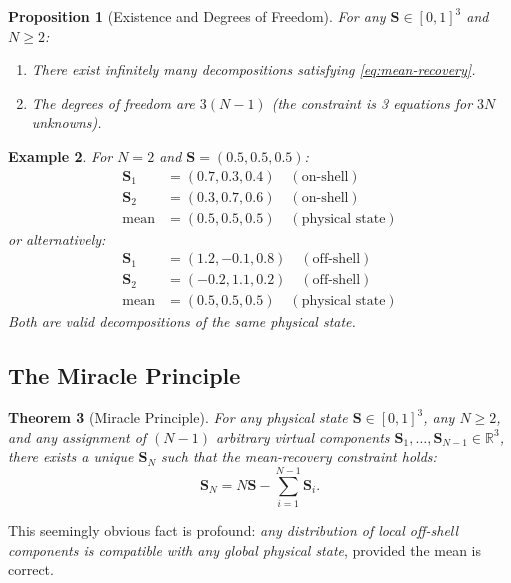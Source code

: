 \documentclass[twocolumn,11pt,a4paper]{article}
\newtheorem{theorem}{Theorem}[section]
\newtheorem{proposition}[theorem]{Proposition}
\newtheorem{example}[theorem]{Example}
\newcommand{\Stuple}{\mathbf{S}}
\begin{document}
\begin{proposition}[Existence and Degrees of Freedom]
For any $\Stuple \in [0,1]^3$ and $N \geq 2$:
\begin{enumerate}[nosep,label=(\roman*)]
  \item There exist infinitely many decompositions satisfying \eqref{eq:mean-recovery}.
  \item The degrees of freedom are $3(N-1)$ (the constraint is 3 equations for $3N$ unknowns).
\end{enumerate}
\end{proposition}

\begin{example}
For $N=2$ and $\Stuple = (0.5, 0.5, 0.5)$:
\begin{align}
\Stuple_1 &= (0.7, 0.3, 0.4) \quad (\text{on-shell})\\
\Stuple_2 &= (0.3, 0.7, 0.6) \quad (\text{on-shell})\\
\text{mean} &= (0.5, 0.5, 0.5) \quad (\text{physical state})
\end{align}
or alternatively:
\begin{align}
\Stuple_1 &= (1.2, -0.1, 0.8) \quad (\text{off-shell})\\
\Stuple_2 &= (-0.2, 1.1, 0.2) \quad (\text{off-shell})\\
\text{mean} &= (0.5, 0.5, 0.5) \quad (\text{physical state})
\end{align}
Both are valid decompositions of the same physical state.
\end{example}

\subsection{The Miracle Principle}

\begin{theorem}[Miracle Principle]
For any physical state $\Stuple \in [0,1]^3$, any $N \geq 2$, and any assignment of $(N-1)$ arbitrary virtual components $\Stuple_1, \ldots, \Stuple_{N-1} \in \mathbb{R}^3$, there exists a unique $\Stuple_N$ such that the mean-recovery constraint holds:
\begin{equation}
  \Stuple_N = N\Stuple - \sum_{i=1}^{N-1} \Stuple_i.
\end{equation}
\end{theorem}

This seemingly obvious fact is profound: \emph{any distribution of local off-shell components is compatible with any global physical state}, provided the mean is correct.
\end{document}
